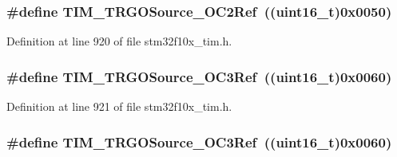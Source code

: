 \subsubsection[{\texorpdfstring{T\+I\+M\+\_\+\+T\+R\+G\+O\+Source\+\_\+\+O\+C2\+Ref}{TIM_TRGOSource_OC2Ref}}]{\setlength{\rightskip}{0pt plus 5cm}\#define T\+I\+M\+\_\+\+T\+R\+G\+O\+Source\+\_\+\+O\+C2\+Ref~(({\bf uint16\+\_\+t})0x0050)}\hypertarget{group___t_i_m___trigger___output___source_ga059f9f6cf96c833180eb3cdf5e56bd04}{}\label{group___t_i_m___trigger___output___source_ga059f9f6cf96c833180eb3cdf5e56bd04}


Definition at line 920 of file stm32f10x\+\_\+tim.\+h.

\subsubsection[{\texorpdfstring{T\+I\+M\+\_\+\+T\+R\+G\+O\+Source\+\_\+\+O\+C3\+Ref}{TIM_TRGOSource_OC3Ref}}]{\setlength{\rightskip}{0pt plus 5cm}\#define T\+I\+M\+\_\+\+T\+R\+G\+O\+Source\+\_\+\+O\+C3\+Ref~(({\bf uint16\+\_\+t})0x0060)}\hypertarget{group___t_i_m___trigger___output___source_ga40943bc1c3f22b983c683cbf0e87a218}{}\label{group___t_i_m___trigger___output___source_ga40943bc1c3f22b983c683cbf0e87a218}


Definition at line 921 of file stm32f10x\+\_\+tim.\+h.

\subsubsection[{\texorpdfstring{T\+I\+M\+\_\+\+T\+R\+G\+O\+Source\+\_\+\+O\+C3\+Ref}{TIM_TRGOSource_OC3Ref}}]{\setlength{\rightskip}{0pt plus 5cm}\#define T\+I\+M\+\_\+\+T\+R\+G\+O\+Source\+\_\+\+O\+C3\+Ref~(({\bf uint16\+\_\+t})0x0060)}\hypertarget{group___t_i_m___trigger___output___source_ga40943bc1c3f22b983c683cbf0e87a218}{}\label{group___t_i_m___trigger___output___source_ga40943bc1c3f22b983c683cbf0e87a218}


